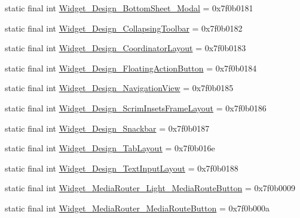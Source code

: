 \begin{CompactItemize}
\item 
static final int \hyperlink{classandroid_1_1support_1_1v7_1_1palette_1_1_r_1_1style_295d7d540eb91fda4fc6e02f13a7f41d}{Widget\_\-Design\_\-BottomSheet\_\-Modal} = 0x7f0b0181
\item 
static final int \hyperlink{classandroid_1_1support_1_1v7_1_1palette_1_1_r_1_1style_e778e72959580a9d5d6fa21c9e4779f2}{Widget\_\-Design\_\-CollapsingToolbar} = 0x7f0b0182
\item 
static final int \hyperlink{classandroid_1_1support_1_1v7_1_1palette_1_1_r_1_1style_7eb66079e1fbffdcc742f12307ec819b}{Widget\_\-Design\_\-CoordinatorLayout} = 0x7f0b0183
\item 
static final int \hyperlink{classandroid_1_1support_1_1v7_1_1palette_1_1_r_1_1style_c1801a40eaf081b8628a6d505b5271c7}{Widget\_\-Design\_\-FloatingActionButton} = 0x7f0b0184
\item 
static final int \hyperlink{classandroid_1_1support_1_1v7_1_1palette_1_1_r_1_1style_309d200cac1f31f2a0c68b8855e6de37}{Widget\_\-Design\_\-NavigationView} = 0x7f0b0185
\item 
static final int \hyperlink{classandroid_1_1support_1_1v7_1_1palette_1_1_r_1_1style_8917a8356fc58a95bb81567db354146f}{Widget\_\-Design\_\-ScrimInsetsFrameLayout} = 0x7f0b0186
\item 
static final int \hyperlink{classandroid_1_1support_1_1v7_1_1palette_1_1_r_1_1style_fc26819407796395dcb3d69102b32995}{Widget\_\-Design\_\-Snackbar} = 0x7f0b0187
\item 
static final int \hyperlink{classandroid_1_1support_1_1v7_1_1palette_1_1_r_1_1style_920be7815e3f2003173514df4f15103f}{Widget\_\-Design\_\-TabLayout} = 0x7f0b016e
\item 
static final int \hyperlink{classandroid_1_1support_1_1v7_1_1palette_1_1_r_1_1style_3ff087db3f1bf57b43080f5b86e6898f}{Widget\_\-Design\_\-TextInputLayout} = 0x7f0b0188
\item 
static final int \hyperlink{classandroid_1_1support_1_1v7_1_1palette_1_1_r_1_1style_6f2c1705941be89e796a0e86d7c8f19c}{Widget\_\-MediaRouter\_\-Light\_\-MediaRouteButton} = 0x7f0b0009
\item 
static final int \hyperlink{classandroid_1_1support_1_1v7_1_1palette_1_1_r_1_1style_bb7854babc10dd1b523528efd504710b}{Widget\_\-MediaRouter\_\-MediaRouteButton} = 0x7f0b000a
\end{CompactItemize}


